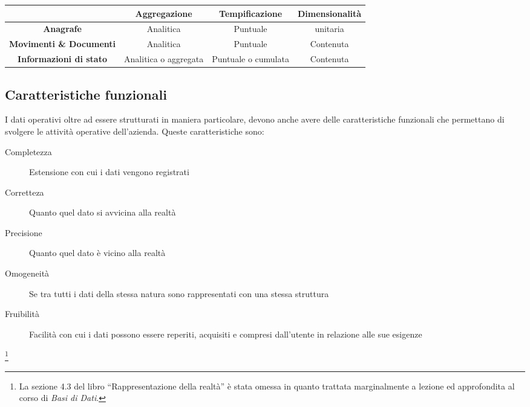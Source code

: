         \begin{table}[H]
            \centering
            \begin{tabular}{|c|c|c|c|}
                \hline
                & \textbf{Aggregazione} & \textbf{Tempificazione} & \textbf{Dimensionalità} \\
                \hline
                \textbf{Anagrafe} & Analitica & Puntuale & unitaria \\
                \hline
                \textbf{Movimenti \& Documenti} & Analitica & Puntuale & Contenuta \\
                \hline
                \textbf{Informazioni di stato} & Analitica o aggregata & Puntuale o cumulata & Contenuta \\
                \hline
            \end{tabular}
        \end{table}
    \subsection{Caratteristiche funzionali}
        I dati operativi oltre ad essere strutturati in maniera particolare, devono anche avere delle caratteristiche funzionali che permettano di svolgere le attività operative dell'azienda. Queste caratteristiche sono:
        \begin{description}
            \item[Completezza] Estensione con cui i dati vengono registrati
            \item[Corretteza] Quanto quel dato si avvicina alla realtà
            \item[Precisione] Quanto quel dato è vicino alla realtà
            \item[Omogeneità] Se tra tutti i dati della stessa natura sono rappresentati con una stessa struttura
            \item[Fruibilità] Facilità con cui i dati possono essere reperiti, acquisiti e compresi dall'utente in relazione alle sue esigenze
        \end{description}

\footnote{
    La sezione 4.3 del libro ``Rappresentazione della realtà'' è stata omessa in quanto trattata marginalmente a lezione ed approfondita al corso di \textit{Basi di Dati}.
}
